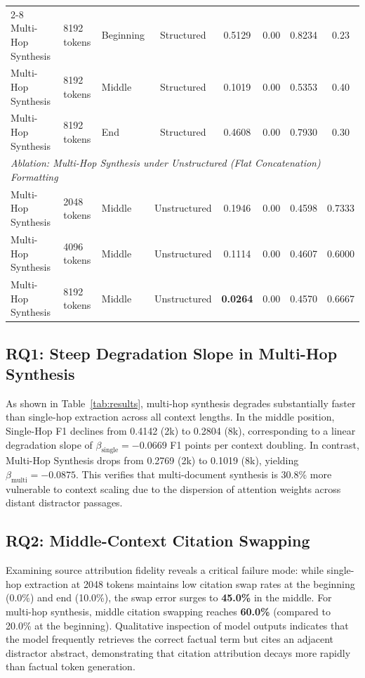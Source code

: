 \documentclass[manuscript,screen,oneside]{acmart}
\begin{document}
\begin{table}[t]
\begin{tabular}{lllccccc}
\cmidrule{2-8}
Multi-Hop Synthesis & 8192 tokens & Beginning & Structured & 0.5129 & 0.00 & 0.8234 & 0.23 \\
Multi-Hop Synthesis & 8192 tokens & Middle & Structured & 0.1019 & 0.00 & 0.5353 & 0.40 \\
Multi-Hop Synthesis & 8192 tokens & End & Structured & 0.4608 & 0.00 & 0.7930 & 0.30 \\
\midrule
\multicolumn{8}{l}{\textit{Ablation: Multi-Hop Synthesis under Unstructured (Flat Concatenation) Formatting}} \\
Multi-Hop Synthesis & 2048 tokens & Middle & Unstructured & 0.1946 & 0.00 & 0.4598 & 0.7333 \\
Multi-Hop Synthesis & 4096 tokens & Middle & Unstructured & 0.1114 & 0.00 & 0.4607 & 0.6000 \\
Multi-Hop Synthesis & 8192 tokens & Middle & Unstructured & \textbf{0.0264} & 0.00 & 0.4570 & 0.6667 \\
\bottomrule
\end{tabular}
\end{table}

\subsection{RQ1: Steep Degradation Slope in Multi-Hop Synthesis}
As shown in Table~\ref{tab:results}, multi-hop synthesis degrades substantially faster than single-hop extraction across all context lengths. In the middle position, Single-Hop F1 declines from 0.4142 (2k) to 0.2804 (8k), corresponding to a linear degradation slope of $\beta_{\text{single}} = -0.0669$ F1 points per context doubling. In contrast, Multi-Hop Synthesis drops from 0.2769 (2k) to 0.1019 (8k), yielding $\beta_{\text{multi}} = -0.0875$. This verifies that multi-document synthesis is 30.8\% more vulnerable to context scaling due to the dispersion of attention weights across distant distractor passages.

\subsection{RQ2: Middle-Context Citation Swapping}
Examining source attribution fidelity reveals a critical failure mode: while single-hop extraction at 2048 tokens maintains low citation swap rates at the beginning (0.0\%) and end (10.0\%), the swap error surges to \textbf{45.0\%} in the middle. For multi-hop synthesis, middle citation swapping reaches \textbf{60.0\%} (compared to 20.0\% at the beginning). Qualitative inspection of model outputs indicates that the model frequently retrieves the correct factual term but cites an adjacent distractor abstract, demonstrating that citation attribution decays more rapidly than factual token generation.
\end{document}
